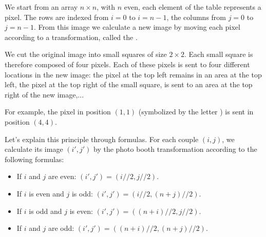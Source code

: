 \documentclass[11pt,class=report,crop=false]{standalone}
\begin{document}




\begin{cours}

We start from an array $n\times n$, with $n$ even, each element of the table represents a pixel. The rows are indexed from $i=0$ to $i=n-1$, the columns from $j=0$ to $j=n-1$.
From this image we calculate a new image by moving each pixel according to a transformation, called the .

We cut the original image into small squares of size $2\times2$.
Each small square is therefore composed of four pixels. Each of these pixels is sent to four different locations in the new image:
the pixel at the top left remains in an area at the top left, the pixel at the top right of the small square, is sent to an area at the top right of the new image,...


For example, the pixel in position $(1,1)$ (symbolized by the letter ) is sent in position $(4,4)$.

\medskip

Let's explain this principle through formulas. For each couple $(i,j)$, we calculate its image $(i',j')$ by the photo booth transformation  according to the following formulas:
\begin{itemize}
  \item If $i$ and $j$ are even: $(i',j') = (i//2,j//2)$.
  \item If $i$ is even and $j$ is odd: $(i',j') = (i//2,(n+j)//2)$.  
  \item If $i$ is odd and $j$ is even: $(i',j') = ((n+i)//2,j//2)$.
  \item If $i$ and $j$ are odd: $(i',j') = ((n+i)//2,(n+j)//2)$.
\end{itemize}


\medskip


\end{cours}
\end{document}
